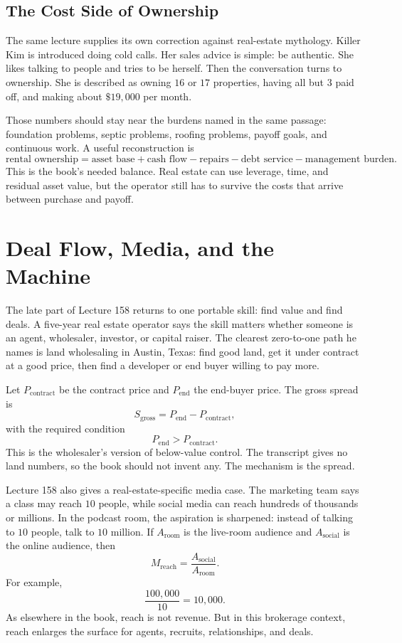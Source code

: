 \documentclass[11pt,oneside]{book}
\begin{document}
\subsection{The Cost Side of Ownership}

The same lecture supplies its own correction against real-estate mythology. Killer Kim is introduced doing cold calls. Her sales advice is simple: be authentic. She likes talking to people and tries to be herself. Then the conversation turns to ownership. She is described as owning \(16\) or \(17\) properties, having all but \(3\) paid off, and making about \(\$19{,}000\) per month.

Those numbers should stay near the burdens named in the same passage: foundation problems, septic problems, roofing problems, payoff goals, and continuous work. A useful reconstruction is
\[
\text{rental ownership}
=
\text{asset base}
+
\text{cash flow}
-
\text{repairs}
-
\text{debt service}
-
\text{management burden}.
\]
This is the book's needed balance. Real estate can use leverage, time, and residual asset value, but the operator still has to survive the costs that arrive between purchase and payoff.

\section{Deal Flow, Media, and the Machine}

The late part of Lecture 158 returns to one portable skill: find value and find deals. A five-year real estate operator says the skill matters whether someone is an agent, wholesaler, investor, or capital raiser. The clearest zero-to-one path he names is land wholesaling in Austin, Texas: find good land, get it under contract at a good price, then find a developer or end buyer willing to pay more.

Let \(P_{\mathrm{contract}}\) be the contract price and \(P_{\mathrm{end}}\) the end-buyer price. The gross spread is
\[
S_{\mathrm{gross}}
=
P_{\mathrm{end}}-P_{\mathrm{contract}},
\]
with the required condition
\[
P_{\mathrm{end}}>P_{\mathrm{contract}}.
\]
This is the wholesaler's version of below-value control. The transcript gives no land numbers, so the book should not invent any. The mechanism is the spread.

Lecture 158 also gives a real-estate-specific media case. The marketing team says a class may reach \(10\) people, while social media can reach hundreds of thousands or millions. In the podcast room, the aspiration is sharpened: instead of talking to \(10\) people, talk to \(10\) million. If \(A_{\mathrm{room}}\) is the live-room audience and \(A_{\mathrm{social}}\) is the online audience, then
\[
M_{\mathrm{reach}}
=
\frac{A_{\mathrm{social}}}{A_{\mathrm{room}}}.
\]
For example,
\[
\frac{100{,}000}{10}=10{,}000.
\]
As elsewhere in the book, reach is not revenue. But in this brokerage context, reach enlarges the surface for agents, recruits, relationships, and deals.
\end{document}
